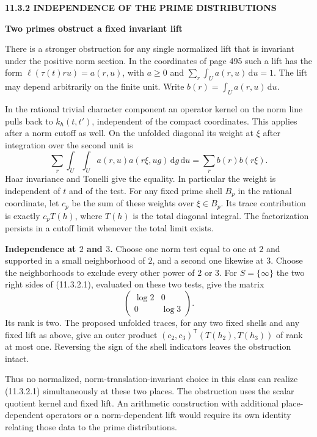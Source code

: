 \documentclass[11pt,letterpaper]{article}
\newcommand{\rightmarktext}{}
\newcommand{\printfolio}{}
\newcommand{\leaf}[4]{\clearpage\gdef\printfolio{#1}\gdef\rightmarktext{#2}%
  {\small\sffamily\bfseries\color{ink}#3\par}\vspace{3pt}%
  {\LARGE\bfseries #4\par}\vspace{5pt}}
\newcommand{\point}[1]{\par\smallskip\textbf{#1.}\enspace\ignorespaces}
\newcommand{\dd}{\,\mathrm d}
\begin{document}
\leaf{495b}{Prime-shell weights}{11.3.2 \quad INDEPENDENCE OF THE PRIME DISTRIBUTIONS}{Two primes obstruct a fixed invariant lift}
There is a stronger obstruction for any single normalized lift that is
invariant under the positive norm section. In the coordinates of page 495
such a lift has the form $\ell(\tau(t)ru)=a(r,u)$, with $a\ge0$ and
$\sum_r\int_U a(r,u)\dd u=1$. The lift may depend arbitrarily on the
finite unit. Write $b(r)=\int_U a(r,u)\dd u$.

In the rational trivial character component an operator kernel on the norm
line pulls back to $k_h(t,t')$, independent of the compact coordinates.
This applies after a norm cutoff as well. On the unfolded diagonal its
weight at $\xi$ after integration over the second unit is
\[
 \sum_r\int_U\!\int_U a(r,u)a(r\xi,ug)\dd g\dd u
             =\sum_r b(r)b(r\xi).
\]
Haar invariance and Tonelli give the equality. In particular the weight is
independent of $t$ and of the test. For any fixed prime shell $B_p$ in
the rational coordinate, let $c_p$ be the sum of these weights over
$\xi\in B_p$. Its trace contribution is exactly $c_p T(h)$, where $T(h)$
is the total diagonal integral. The factorization persists in a cutoff
limit whenever the total limit exists.

\point{Independence at $2$ and $3$} Choose one norm test equal to one at
$2$ and supported in a small neighborhood of $2$, and a second one
likewise at $3$. Choose the neighborhoods to exclude every other power
of $2$ or $3$. For $S=\{\infty\}$ the two right sides of (11.3.2.1),
evaluated on these two tests, give the matrix
\[
             \begin{pmatrix}\log 2&0\\0&\log 3\end{pmatrix}.
\]
Its rank is two. The proposed unfolded traces, for any two fixed shells
and any fixed lift as above, give an outer product
$(c_2,c_3)^{\mathsf T}(T(h_2),T(h_3))$ of rank at most one. Reversing
the sign of the shell indicators leaves the obstruction intact.

Thus no normalized, norm-translation-invariant choice in this class can
realize (11.3.2.1) simultaneously at these two places. The obstruction
uses the scalar quotient kernel and fixed lift. An arithmetic construction
with additional place-dependent operators or a norm-dependent lift would
require its own identity relating those data to the prime distributions.
\end{document}
